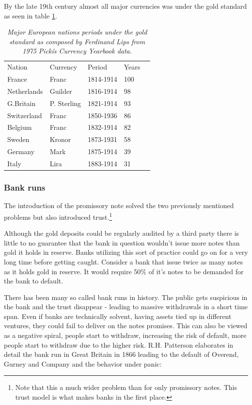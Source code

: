 By the late 19th century almost all major currencies was under the gold standard as seen in table \ref{tab:gold:standard}.

\begin{table}[!htb]
	\begin{tabular}{lllll}
		Nation & Currency & Period & Years \\
		France & Franc & 1814-1914 & 100 \\
		Netherlands & Guilder & 1816-1914 & 98 \\
		G.Britain & P. Sterling & 1821-1914 & 93 \\
		Switzerland & Franc & 1850-1936 & 86 \\
		Belgium & Franc & 1832-1914 & 82 \\
		Sweden & Kronor & 1873-1931 & 58 \\
		Germany & Mark & 1875-1914 & 39 \\
		Italy & Lira & 1883-1914 & 31 \\   
	\end{tabular}
	\caption{\textit{ Major European nations periods under the gold standard
			as composed by Ferdinand Lips\cite{lips:gold:wars} from 1975 Pickís Currency Yearbook data.
	}}
	\label{tab:gold:standard}
\end{table}

\subsubsection{Bank runs}

The introduction of the promissory note solved the two previously mentioned problems but also 
introduced trust.\footnote{Note that this a much wider problem than for only promissory notes. This trust model is what makes banks in the first place.} 

Although the gold deposits could be regularly audited by a third party there is little to no guarantee that the bank in question wouldn't issue more notes than gold it holds in reserve. Banks utilizing this sort of practice could go on for a very long time before getting caught. Consider a bank that issue twice as many notes as it holds gold in reserve. It would require 50\% of it's notes to be demanded for the bank to default.  
  
There has been many so called bank runs in history. The public gets suspicious in the bank and the trust disappear - leading to massive withdrawals in a short time span. Even if banks are technically solvent, having assets tied up in different ventures, they could fail to deliver on the notes promises. This can also be viewed as a negative spiral, people start to withdraw, increasing the risk of default, more people start to withdraw due to the higher risk. R.H. Patterson elaborates in detail the bank run in Great Britain in 1866 leading to the default of Overend, Gurney and Company and the behavior under panic: 

